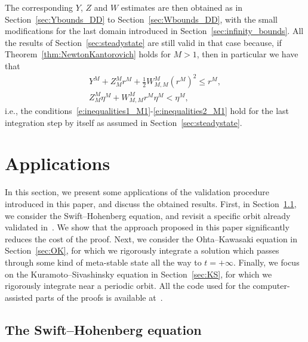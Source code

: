 \documentclass[10pt,a4paper]{article}
\theoremstyle{plain}
\newcommand{\1}{\mathbf{1}}
\begin{document}
The corresponding $Y$, $Z$ and $W$ estimates are then obtained as in Section~\ref{sec:Ybounds_DD} to Section~\ref{sec:Wbounds_DD}, with the small modifications for the last domain introduced in Section~\ref{sec:infinity_bounds}. All the results of Section~\ref{sec:steadystate} are still valid in that case because, if Theorem~\ref{thm:NewtonKantorovich} holds for $M>1$, then in particular we have that
\begin{align*}
Y^M + Z_M^M r^M + \frac{1}{2}W_{M,M}^{M} \left(r^M\right)^2 \leq r^{M}, \\
Z_M^M \eta^M + W^M_{M,M} r^M \eta^M < \eta^M,
\end{align*}
i.e., the conditions~\eqref{e:inequalities1_M1}-\eqref{e:inequalities2_M1} hold for the last integration step by itself as assumed in Section~\ref{sec:steadystate}.


\section{Applications}
\label{sec:examples}

In this section, we present some applications of the validation procedure introduced in this paper, and discuss the obtained results. First, in Section~\ref{sec:SH}, we consider the Swift--Hohenberg equation, and revisit a specific orbit already validated in~\cite{BerBreShe24}. We show that the approach proposed in this paper significantly reduces the cost of the proof.
Next, we consider the Ohta--Kawasaki equation in Section~\ref{sec:OK}, for which we rigorously integrate a solution which passes through some kind of meta-stable state all the way to $t=+\infty$. Finally, we focus on the Kuramoto--Sivashinsky equation in Section~\ref{sec:KS}, for which we rigorously integrate near a periodic orbit. All the code used for the computer-assisted parts of the proofs is available at~\cite{integratorcode_new}.

\subsection{The Swift--Hohenberg equation}
\label{sec:SH}
\end{document}

